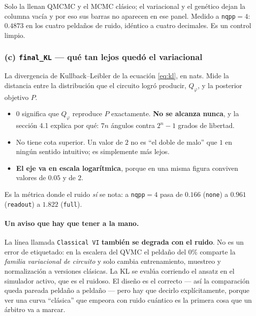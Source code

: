 \documentclass[11pt,a4paper]{article}
\begin{document}
\noindent
Solo la llenan QMCMC y el MCMC clásico; el variacional y el genético dejan la
columna vacía y por eso sus barras no aparecen en ese panel. Medido a
\texttt{nqpp}$=4$: $0.4873$ en los cuatro peldaños de ruido, idéntico a
cuatro decimales. Es un control limpio.

\subsubsection*{(c) \texttt{final\_KL} --- qué tan lejos quedó el variacional}

La divergencia de Kullback--Leibler de la ecuación \eqref{eq:kl}, en nats.
Mide la distancia entre la distribución que el circuito logró producir,
$Q_\varphi$, y la posterior objetivo $P$.

\begin{itemize}[leftmargin=1.6em]
  \item $0$ significa que $Q_\varphi$ reproduce $P$ exactamente. \textbf{No
    se alcanza nunca}, y la sección 4.1 explica por qué: $7n$ ángulos contra
    $2^n-1$ grados de libertad.
  \item No tiene cota superior. Un valor de $2$ no es ``el doble de malo''
    que $1$ en ningún sentido intuitivo; es simplemente más lejos.
  \item \textbf{El eje va en escala logarítmica}, porque en una misma figura
    conviven valores de $0.05$ y de $2$.
\end{itemize}

\noindent
Es la métrica donde el ruido \emph{sí} se nota: a \texttt{nqpp}$=4$ pasa de
$0.166$ (\texttt{none}) a $0.961$ (\texttt{readout}) a $1.822$
(\texttt{full}).

\paragraph{Un aviso que hay que tener a la mano.} La línea llamada
\texttt{Classical VI} \textbf{también se degrada con el ruido}. No es un
error de etiquetado: en la escalera del QVMC el peldaño del $0\%$ comparte
la \emph{familia variacional de circuito} y solo cambia entrenamiento,
muestreo y normalización a versiones clásicas. La KL se evalúa corriendo el
ansatz en el simulador activo, que es el ruidoso. El diseño es el correcto
--- así la comparación queda pareada peldaño a peldaño --- pero hay que
decirlo explícitamente, porque ver una curva ``clásica'' que empeora con
ruido cuántico es la primera cosa que un árbitro va a marcar.
\end{document}
